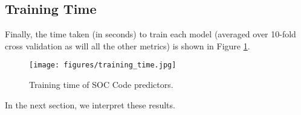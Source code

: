 \subsection{Training Time}

Finally, the time taken (in seconds) to train each model (averaged over 10-fold cross validation as will all the other metrics) is shown in Figure \ref{fig:TrainingTime}.
\begin{figure}[h!]
    \centering
    \texttt{[image: figures/training\_time.jpg]}
    \caption{Training time of SOC Code predictors.}
    \label{fig:TrainingTime}
\end{figure}

In the next section, we interpret these results.

